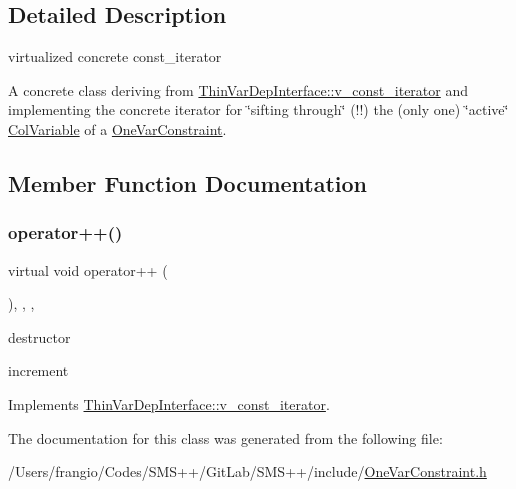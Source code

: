\subsection{Detailed Description}
virtualized concrete const\+\_\+iterator 

A concrete class deriving from \mbox{\hyperlink{class_s_m_spp__di__unipi__it_1_1_thin_var_dep_interface_1_1v__const__iterator}{Thin\+Var\+Dep\+Interface\+::v\+\_\+const\+\_\+iterator}} and implementing the concrete iterator for \char`\"{}sifting through\char`\"{} (!!) the (only one) \char`\"{}active\char`\"{} \mbox{\hyperlink{class_s_m_spp__di__unipi__it_1_1_col_variable}{Col\+Variable}} of a \mbox{\hyperlink{class_s_m_spp__di__unipi__it_1_1_one_var_constraint}{One\+Var\+Constraint}}. 

\subsection{Member Function Documentation}
\mbox{\label{class_s_m_spp__di__unipi__it_1_1_one_var_constraint_1_1v__const__iterator_af860fe44bc54c0cbca8e733ab0e954e0}} 
\subsubsection{\texorpdfstring{operator++()}{operator++()}}
{\footnotesize\ttfamily virtual void operator++ (\begin{DoxyParamCaption}\item[{void}]{ }\end{DoxyParamCaption})\hspace{0.3cm}{\ttfamily [inline]}, {\ttfamily [final]}, {\ttfamily [override]}, {\ttfamily [virtual]}}



destructor 

increment 

Implements \mbox{\hyperlink{group___thin_var_dep_interface___c_l_a_s_s_e_s_ga79fc9d17094dc591d6b48bc296028d51}{Thin\+Var\+Dep\+Interface\+::v\+\_\+const\+\_\+iterator}}.



The documentation for this class was generated from the following file\+:\begin{DoxyCompactItemize}
\item 
/\+Users/frangio/\+Codes/\+S\+M\+S++/\+Git\+Lab/\+S\+M\+S++/include/\mbox{\hyperlink{_one_var_constraint_8h}{One\+Var\+Constraint.\+h}}\end{DoxyCompactItemize}
